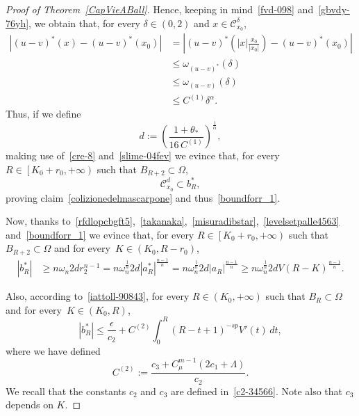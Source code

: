 \documentclass[12pt]{article}
\numberwithin{equation}{section}
\renewcommand{\leq}{\leqslant}
\renewcommand{\geq}{\geqslant}
\begin{document}
\begin{proof}[Proof of Theorem~\ref{CapVieABall}]
Hence, keeping in mind~\eqref{fvd-098} and~\eqref{gbvdy-76yh}, we obtain that, for every $\delta\in (0,2)$  and $x\in \mathcal{C}_{x_0}^\delta$,
\begin{equation}\label{slime-04fev}
\begin{split}
\left|(u-v)^*(x)-(u-v)^*(x_0)\right|&=\left|(u-v)^* \left(\left|x\right|\frac{x_0}{\left|x_0 \right|}\right)-(u-v)^*(x_0)\right|\\
&\leq \omega_{(u-v)^*}(\delta)\\
&\leq \omega_{(u-v)}(\delta)\\
&\leq C^{(1)}\delta^\alpha.
\end{split}
\end{equation}
Thus, if we define
\begin{equation*}
d:=\left(\frac{1+\theta_*}{16\, C^{(1)}}\right)^\frac{1}{\alpha},
\end{equation*} 
making use of~\eqref{cre-8} and~\eqref{slime-04fev} we evince that, for every $R\in \left[K_0+r_0,+\infty\right)$ such that $B_{R+2}\subset\Omega$,
\begin{equation*}
\mathcal{C}_{x_0}^d\subset b_{R}^*,
\end{equation*}
proving claim~\eqref{colizionedelmascarpone} and thus~\eqref{boundforr_1}.

Now, thanks to~\eqref{rfdlopcbgft5},~\eqref{takanaka},~\eqref{misuradibstar},~\eqref{levelsetpalle4563} and~\eqref{boundforr_1} we evince that, for every $R\in \left[K_0+r_0,+\infty\right)$ such that~$B_{R+2}\subset\Omega$ and for
every~$K\in \left(K_0,R-r_0\right)$,
\begin{equation}\label{njtg-bgd-0843}
\begin{split}
\left|b_{R}^*\right|&\geq n\omega_n 2d r_2^{n-1}=n\omega_n^{\frac{1}{n}} 2d \left|a_R^*\right|^{\frac{n-1}{n}}= n\omega_n^{\frac{1}{n}} 2d \left|a_R\right|^{\frac{n-1}{n}} \geq n\omega_n^{\frac{1}{n}} 2d V(R-K)^{\frac{n-1}{n}}.  
\end{split}
\end{equation}

Also, according to~\eqref{iattoll-90843}, for every $R\in\left( K_0,+\infty\right)$ such that $B_R\subset\Omega$ and for every~$K\in (K_0,R)$,
\begin{equation}\label{zfvcbghbf5643e}
\left|b_R^*\right|\leq \frac{\epsilon}{c_2}+ C^{(2)} \int_{0}^R  (R-t+1)^{-sp}V'(t)\,dt,
\end{equation}
where we have defined 
\begin{equation}\label{kdvgtecas45237777}
C^{(2)}:=\frac{c_3+C_\mu^{m-1}(2c_1+\Lambda)}{c_2}. 
\end{equation}
We recall that the constants $c_2$ and $c_3$ are defined in~\eqref{c2-34566}. Note also that $c_3$ depends on $K$.


\end{proof}
\end{document}
